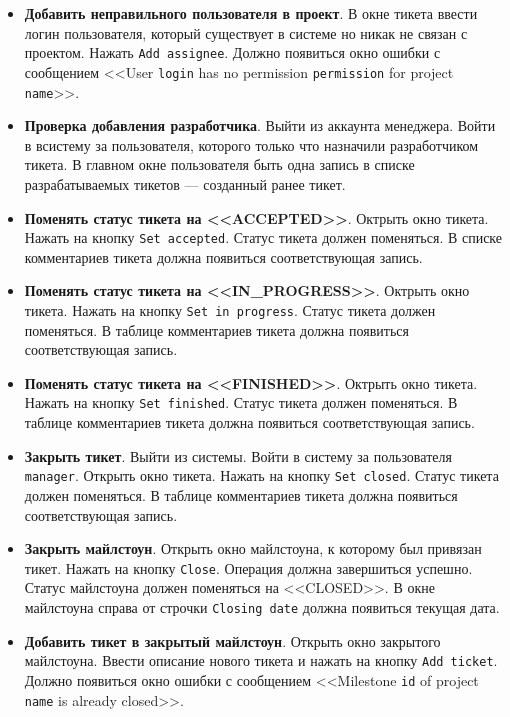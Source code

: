 \begin{itemize}
	\item \textbf{Добавить неправильного пользователя в проект}. В окне тикета ввести логин пользователя, который существует в системе но никак не связан с проектом. Нажать \texttt{Add assignee}. Должно появиться окно ошибки с сообщением <<User \texttt{login} has no permission \texttt{permission} for project \texttt{name}>>.
	
	\item \textbf{Проверка добавления разработчика}. Выйти из аккаунта менеджера. Войти в всистему за пользователя, которого только что назначили разработчиком тикета. В главном окне пользователя быть одна запись в списке разрабатываемых тикетов --- созданный ранее тикет.
	
	\item \textbf{Поменять статус тикета на <<ACCEPTED>>}. Октрыть окно тикета. Нажать на кнопку \texttt{Set accepted}. Статус тикета должен поменяться. В списке комментариев тикета должна появиться соответствующая запись.
	
	\item \textbf{Поменять статус тикета на <<IN\_PROGRESS>>}. Октрыть окно тикета. Нажать на кнопку \texttt{Set in progress}. Статус тикета должен поменяться. В таблице комментариев тикета должна появиться соответствующая запись.
	
	\item \textbf{Поменять статус тикета на <<FINISHED>>}. Октрыть окно тикета. Нажать на кнопку \texttt{Set finished}. Статус тикета должен поменяться. В таблице комментариев тикета должна появиться соответствующая запись.
	
	\item \textbf{Закрыть тикет}. Выйти из системы. Войти в систему за пользователя \texttt{manager}. Открыть окно тикета. Нажать на кнопку \texttt{Set closed}. Статус тикета должен поменяться. В таблице комментариев тикета должна появиться соответствующая запись.
	
	\item \textbf{Закрыть майлстоун}. Открыть окно майлстоуна, к которому был привязан тикет. Нажать на кнопку \texttt{Close}. Операция должна завершиться успешно. Статус майлстоуна должен поменяться на <<CLOSED>>. В окне майлстоуна справа от строчки \texttt{Closing date} должна появиться текущая дата.
	
	\item \textbf{Добавить тикет в закрытый майлстоун}. Открыть окно закрытого майлстоуна. Ввести описание нового тикета и нажать на кнопку \texttt{Add ticket}. Должно появиться окно ошибки с сообщением <<Milestone \texttt{id} of project \texttt{name} is already closed>>.
	

\end{itemize}
